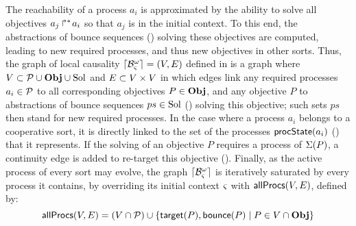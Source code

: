 The reachability of a process $a_i$ is approximated by the ability to solve all objectives $\mbox{${a}_{j}\Rsh^*\!{a}_{i}$}$ so that $a_j$ is in the initial context.
To this end, the abstractions of bounce sequences () solving these objectives are computed, leading to new required processes, and thus new objectives in other sorts.
Thus, the graph of local causality $\lceil \mathcal{B}_\varsigma^\omega\rceil = (V, E)$ defined in  is a graph where $V \subset \mathcal{P} \cup \mathbf{Obj} \cup \mathrm{Sol}$ and $E \subset V \times V$
in which edges link any required processes $a_i \in \mathcal{P}$ to all corresponding objectives $P \in \mathbf{Obj}$,
and any objective $P$ to abstractions of bounce sequences $ps \in \mathrm{Sol}$ () solving this objective;
such sets $ps$ then stand for new required processes.
In the case where a process $a_i$ belongs to a cooperative sort, it is directly linked to the set of the processes $\mathsf{procState}(a_i)$ () that it represents.
If the solving of an objective $P$ requires a process of $\Sigma(P)$, a continuity edge is added to re-target this objective ().
Finally, as the active process of every sort may evolve, the graph $\lceil \mathcal{B}_\varsigma^\omega\rceil$ is iteratively saturated by every process it contains,
by overriding its initial context $\varsigma$ with $\mathsf{allProcs}(V, E)$, defined by:
$$\mathsf{allProcs}(V, E) = (V \cap \mathcal{P}) \cup \{ \mathsf{target}(P), \mathsf{bounce}(P) \mid P \in V \cap \mathbf{Obj} \}$$


